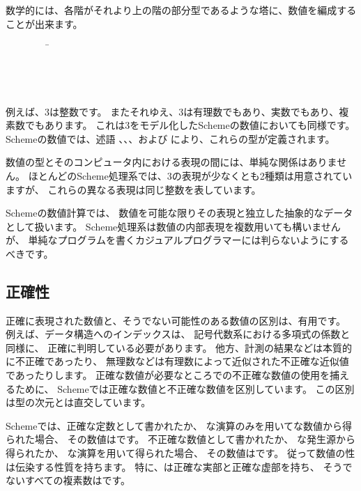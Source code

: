 \vest 数学的には、各階がそれより上の階の部分型であるような塔に、数値を編成することが出来ます。
\begin{tabbing}
\ \ \ \ \ \ \ \ \ \= \\
\>  \\
\>  \\
\>  \\
\>  
\end{tabbing}

例えば、3は整数です。
またそれゆえ、3は有理数でもあり、実数でもあり、複素数でもあります。
これは3をモデル化したSchemeの数値においても同様です。
Schemeの数値では、述語
、、、および
により、これらの型が定義されます。

数値の型とそのコンピュータ内における表現の間には、単純な関係はありません。
ほとんどのScheme処理系では、3の表現が少なくとも2種類は用意されていますが、
これらの異なる表現は同じ整数を表しています。

Schemeの数値計算では、
数値を可能な限りその表現と独立した抽象的なデータとして扱います。
Scheme処理系は数値の内部表現を複数用いても構いませんが、
単純なプログラムを書くカジュアルプログラマーには判らないようにするべきです。

\subsection{正確性}

 \label{exactly}

正確に表現された数値と、そうでない可能性のある数値の区別は、有用です。
例えば、データ構造へのインデックスは、
記号代数系における多項式の係数と同様に、
正確に判明している必要があります。
他方、計測の結果などは本質的に不正確であったり、
無理数などは有理数によって近似された不正確な近似値であったりします。
正確な数値が必要なところでの不正確な数値の使用を捕えるために、
Schemeでは正確な数値と不正確な数値を区別しています。
この区別は型の次元とは直交しています。

Schemeでは、正確な定数として書かれたか、
な演算のみを用いてな数値から得られた場合、
その数値はです。
不正確な数値として書かれたか、
な発生源から得られたか、
な演算を用いて得られた場合、
その数値はです。
従って数値の性は伝染する性質を持ちます。
特に、は正確な実部と正確な虚部を持ち、
そうでないすべての複素数はです。

